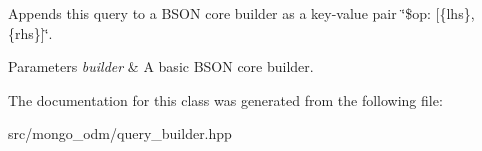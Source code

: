Appends this query to a B\+S\+ON core builder as a key-\/value pair \char`\"{}\$op\+: \mbox{[}\{lhs\}, \{rhs\}\mbox{]}\char`\"{}. 


\begin{DoxyParams}{Parameters}
{\em builder} & A basic B\+S\+ON core builder. \\
\hline
\end{DoxyParams}


The documentation for this class was generated from the following file\+:\begin{DoxyCompactItemize}
\item 
src/mongo\+\_\+odm/query\+\_\+builder.\+hpp\end{DoxyCompactItemize}
